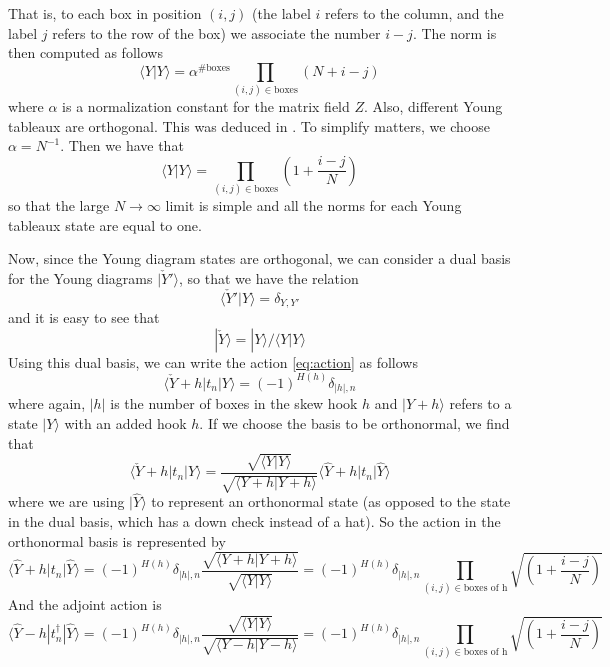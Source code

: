 \documentclass[12pt,nofootinbib, longbibliography]{revtex4-1}
\newcommand\ket[1]{| #1\rangle}
\newcommand\bra[1]{\langle #1|}
\newcommand\braket[2]{\langle #1|#2\rangle}
\begin{document}
That is, to each box in position $(i,j)$ (the label $i$ refers to the column, and the label $j$ refers to the row of the box) we associate the number $i-j$. The norm is then computed as follows
\begin{equation}
\braket Y Y = \alpha ^{\# \text{boxes}}\prod_{(i,j) \in \text{boxes}} (N+i-j)
\end{equation}
where $\alpha$ is a normalization constant for the matrix field $Z$. Also, different Young tableaux are orthogonal. This was deduced in \cite{Corley:2001zk}.
 To simplify matters, we choose $\alpha= N^{-1}$. Then we have that 
\begin{equation}
\braket Y Y =\prod_{(i,j) \in \text{boxes}}\left(1+\frac{i-j}N\right)
\end{equation} 
so that the large $N\to \infty$ limit is simple and all the norms for each Young tableaux state are equal to one. 

Now, since the Young diagram states are orthogonal, we can consider a dual basis for the Young diagrams $\ket {\check Y'}$, so that we have the relation
\begin{equation}
\braket { \check Y ' }{ Y} = \delta_{Y,Y'}
\end{equation}
and it is easy to see that 
\begin{equation}
\ket {\check Y} = \ket{Y}/\braket YY 
\end{equation}
Using this dual basis, we can write the action \eqref{eq:action} as follows
\begin{equation}
\bra{\check Y+h} t_n \ket Y = (-1)^{H(h)} \delta_{|h|,n} 
\end{equation}
where again,  $|h|$ is the number of boxes in the skew hook $h$ and $\ket{Y+h}$ refers to a state $\ket{Y}$ with an added hook $h$. If we choose the basis to be orthonormal, we find that 
\begin{equation}
\bra{\check Y+h} t_n \ket Y =  \frac{\sqrt{\braket YY}}{{\sqrt{\braket{Y+h}{Y+h}}}}\bra{\hat Y+h} t_n \ket{\hat Y}
\end{equation}
where we are using $\ket{\hat Y}$ to represent an orthonormal state (as opposed to the state in the dual basis, which has a down check instead of a hat). So the action in the orthonormal basis is represented by 
\begin{equation}
\bra{\hat Y+h} t_n \ket{\hat Y} = (-1)^{H(h)} \delta_{|h|,n} \frac{\sqrt{\braket{Y+h}{Y+h}}}{\sqrt{\braket YY}}=(-1)^{H(h)} \delta_{|h|,n} \prod_{(i,j)\in {\text{boxes of h}}} \sqrt{\left(1+\frac{i-j}N\right)}
\end{equation}
And the adjoint action is
\begin{equation}
\bra{\hat Y-h} t_n^\dagger\ket{\hat Y} = (-1)^{H(h)} \delta_{|h|,n} \frac{\sqrt{\braket{Y}{Y}}}{\sqrt{\braket{ Y-h}{Y-h}}}=(-1)^{H(h)} \delta_{|h|,n} \prod_{(i,j)\in {\text{boxes of h}}} \sqrt{\left(1+\frac{i-j}N\right)}\label{eq:normalized}
\end{equation}
\end{document}
